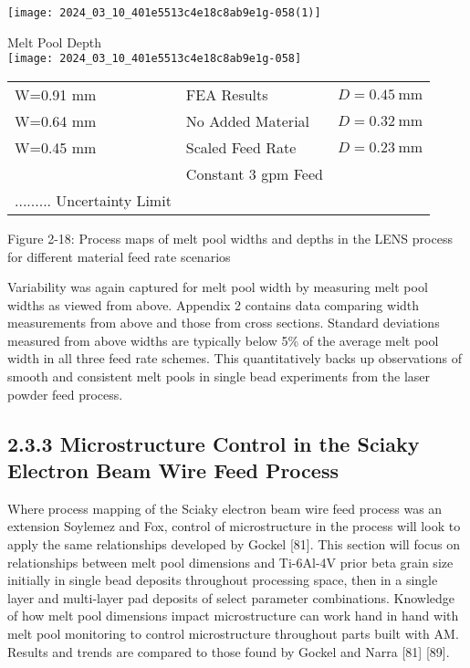 \documentclass[10pt]{article}
\begin{document}
\begin{center}
\texttt{[image: 2024\_03\_10\_401e5513c4e18c8ab9e1g-058(1)]}
\end{center}

Melt Pool Depth\\
\texttt{[image: 2024\_03\_10\_401e5513c4e18c8ab9e1g-058]}

\begin{center}
\begin{tabular}{lll}
W=0.91 mm & FEA Results & $D=0.45 \mathrm{~mm}$ \\
W=0.64 mm & No Added Material & $D=0.32 \mathrm{~mm}$ \\
W=0.45 mm & Scaled Feed Rate & $D=0.23 \mathrm{~mm}$ \\
 & Constant 3 gpm Feed &  \\
\hline
......... Uncertainty Limit &  &  \\
\hline
\end{tabular}
\end{center}

Figure 2-18: Process maps of melt pool widths and depths in the LENS process for different material feed rate scenarios

Variability was again captured for melt pool width by measuring melt pool widths as viewed from above. Appendix 2 contains data comparing width measurements from above and those from cross sections. Standard deviations measured from above widths are typically below 5\% of the average melt pool width in all three feed rate schemes. This quantitatively backs up observations of smooth and consistent melt pools in single bead experiments from the laser powder feed process.

\subsection*{2.3.3 Microstructure Control in the Sciaky Electron Beam Wire Feed Process}
Where process mapping of the Sciaky electron beam wire feed process was an extension Soylemez and Fox, control of microstructure in the process will look to apply the same relationships developed by Gockel [81]. This section will focus on relationships between melt pool dimensions and Ti-6Al-4V prior beta grain size initially in single bead deposits throughout processing space, then in a single layer and multi-layer pad deposits of select parameter combinations. Knowledge of how melt pool dimensions impact microstructure can work hand in hand with melt pool monitoring to control microstructure throughout parts built with AM. Results and trends are compared to those found by Gockel and Narra [81] [89].
\end{document}
